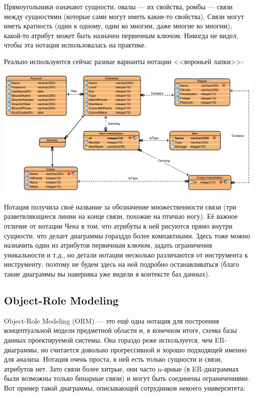 \documentclass[a5paper]{article}
\begin{document}
Прямоугольники означают сущности, овалы --- их свойства, ромбы --- связи между сущностями (которые сами могут иметь какие-то свойства). Связи могут иметь кратность (один к одному, один ко многим, даже многие ко многим), какой-то атрибут может быть назначен первичным ключом. Никогда не видел, чтобы эта нотация использовалась на практике.

Реально используются сейчас разные варианты нотации <<вороньей лапки>>:

\begin{center}
    \includegraphics[width=\textwidth]{erCrowsFoot.png}
\end{center}

Нотация получила своё название за обозначение множественности связи (три разветвляющиеся линии на конце связи, похожие на птичью ногу). Её важное отличие от нотации Чена в том, что атрибуты в ней рисуются прямо внутри сущности, что делает диаграммы горазддо более компактными. Здесь тоже можно назначить один из атрибутов первичным ключом, задать ограничения уникальности и т.д., но детали нотации несколько различаются от инструмента к инструменту, поэтому не будем здесь на ней подробно останавливаться (благо такие диаграммы вы наверняка уже видели в контексте баз данных).

\subsection{Object-Role Modeling}

Object-Role Modeling (ORM) --- это ещё одна нотация для построения концептуальной модели предметной области и, в конечном итоге, схемы базы данных проектируемой системы. Она гораздо реже используется, чем ER-диаграммы, но считается довольно прогрессивной и хорошо подходящей именно для анализа. Нотация очень проста, в ней есть только сущности и связи, атрибутов нет. Зато связи более хитрые, они часто n-арные (в ER-диаграммах были возможны только бинарные связи) и могут быть соединены ограничениями. Вот пример такой диаграммы, описывающей сотрудников некоего университета:
\end{document}
